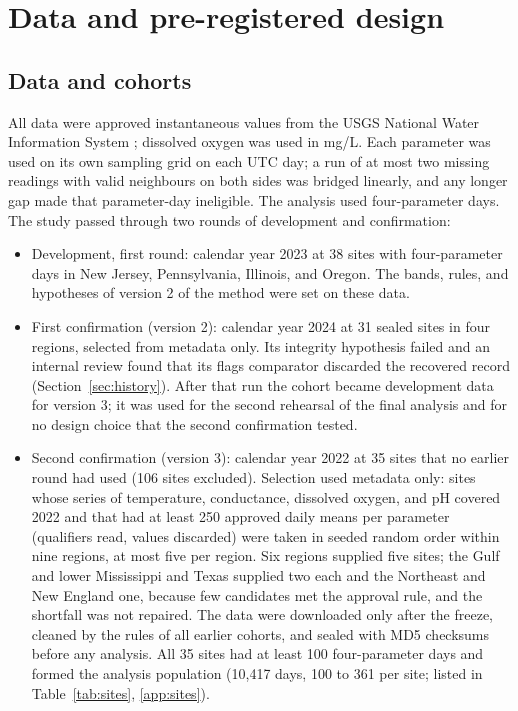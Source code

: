 ﻿\section{Data and pre-registered design}
\label{sec:study}

\subsection{Data and cohorts}
\label{sec:data}
All data were approved instantaneous values from the USGS National Water Information System \citep{usgs2016nwis}; dissolved oxygen was used in mg/L. Each parameter was used on its own sampling grid on each UTC day; a run of at most two missing readings with valid neighbours on both sides was bridged linearly, and any longer gap made that parameter-day ineligible. The analysis used four-parameter days. The study passed through two rounds of development and confirmation:
\begin{itemize}
  \item Development, first round: calendar year 2023 at 38 sites with four-parameter days in New Jersey, Pennsylvania, Illinois, and Oregon. The bands, rules, and hypotheses of version 2 of the method were set on these data.
  \item First confirmation (version 2): calendar year 2024 at 31 sealed sites in four regions, selected from metadata only. Its integrity hypothesis failed and an internal review found that its flags comparator discarded the recovered record (Section~\ref{sec:history}). After that run the cohort became development data for version 3; it was used for the second rehearsal of the final analysis and for no design choice that the second confirmation tested.
  \item Second confirmation (version 3): calendar year 2022 at 35 sites that no earlier round had used (106 sites excluded). Selection used metadata only: sites whose series of temperature, conductance, dissolved oxygen, and pH covered 2022 and that had at least 250 approved daily means per parameter (qualifiers read, values discarded) were taken in seeded random order within nine regions, at most five per region. Six regions supplied five sites; the Gulf and lower Mississippi and Texas supplied two each and the Northeast and New England one, because few candidates met the approval rule, and the shortfall was not repaired. The data were downloaded only after the freeze, cleaned by the rules of all earlier cohorts, and sealed with MD5 checksums before any analysis. All 35 sites had at least 100 four-parameter days and formed the analysis population (10,417 days, 100 to 361 per site; listed in Table~\ref{tab:sites}, \ref{app:sites}).
\end{itemize}


